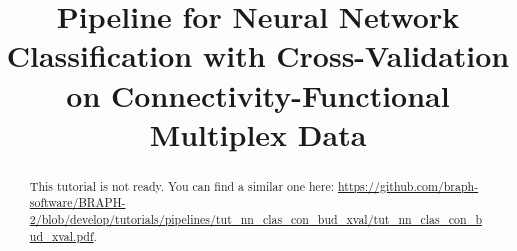 \documentclass[justified]{tufte-handout}
\title[Classification Cross-Validation Connectivity-Functional Multiplex Data]{Pipeline for Neural Network Classification with Cross-Validation on Connectivity-Functional Multiplex Data}
\begin{document}
\maketitle

\begin{abstract}
\noindent
This tutorial is not ready. You can find a similar one here: \url{https://github.com/braph-software/BRAPH-2/blob/develop/tutorials/pipelines/tut_nn_clas_con_bud_xval/tut_nn_clas_con_bud_xval.pdf}.
\end{abstract}
\end{document}
